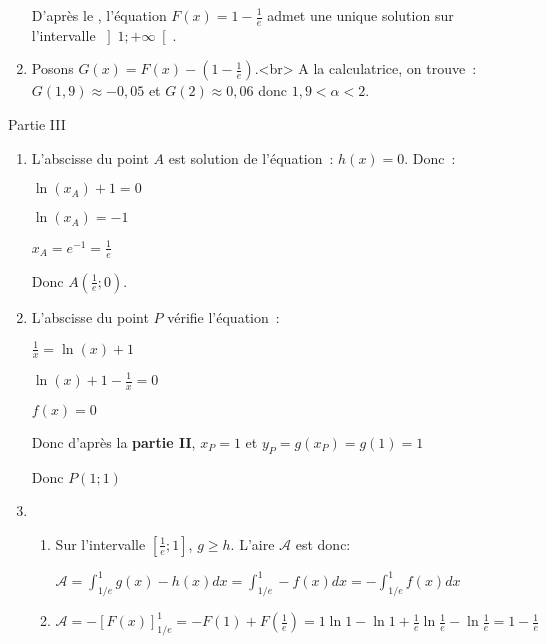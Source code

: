 \begin{corrige}
\begin{enumerate}
          \par
          D'après le ,  l'équation $F\left(x\right)=1-\frac{1}{e}$ admet une unique solution sur l'intervalle $\left]1;+\infty \right[$.
          \item
          Posons $G\left(x\right)=F\left(x\right) - \left(1-\frac{1}{e}\right)$.<br>
          A la calculatrice, on trouve : $G\left(1,9\right)\approx -0,05$ et $G\left(2\right)\approx 0,06$ donc $1,9 < \alpha  < 2$.
     \end{enumerate}
     \begin{h3} Partie III \end{h3}
     \begin{enumerate}
          \item
          L'abscisse du point $A$ est solution de l'équation : $h\left(x\right)=0$. Donc :
          \par
          $\ln\left(x_{A}\right)+1=0$
          \par
          $\ln\left(x_{A}\right)=-1$
          \par
          $x_{A}=e^{-1}=\frac{1}{e}$
          \par
          Donc $A\left(\frac{1}{e};0\right)$.
          \item
          L'abscisse du point $P$ vérifie l'équation :
          \par
          $\frac{1}{x}=\ln\left(x\right)+1$
          \par
          $\ln\left(x\right)+1-\frac{1}{x}=0$
          \par
          $f\left(x\right)=0$
          \par
          Donc d'après la\textbf{ partie II},  $x_{P}=1$ et $y_{P}=g\left(x_{P}\right)=g\left(1\right)=1$
          \par
          Donc $P\left(1;1\right)$
          \item
          \begin{enumerate}
               \item
               Sur l'intervalle $\left[\frac{1}{e} ; 1\right]$, $g\geqslant h$. L'aire $\mathscr A$ est donc:
               \par
               $\mathscr A=\int_{1/e}^{1}g\left(x\right)-h\left(x\right)dx = \int_{1/e}^{1}-f\left(x\right)dx = -\int_{1/e}^{1}f\left(x\right)dx$
               \item
               $\mathscr A=-\left[F\left(x\right)\right]_{1/e}^{1} = -F\left(1\right)+F\left(\frac{1}{e}\right) = 1\ln 1-\ln 1+\frac{1}{e} \ln \frac{1}{e}-\ln \frac{1}{e} = 1-\frac{1}{e}$

\end{enumerate}
\end{enumerate}
\end{corrige}
